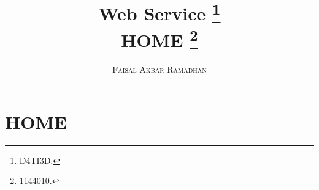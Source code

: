 \documentclass[a4paper,11pt]{book}
\title{\Huge \textbf{Web Service}  \footnote{D4TI3D.} \\ \huge HOME \footnote{1144010.}}
\author{\textsc{Faisal Akbar Ramadhan}
}
\begin{document}
\maketitle


\chapter*{HOME}





\end{document}
